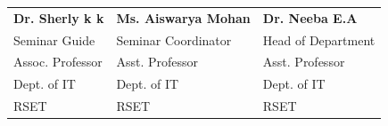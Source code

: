 \vspace{4cm}
\begin{center}
   \begin{tabularx}{1 \textwidth} { 
   >{\raggedright\arraybackslash}X 
   >{\centering\arraybackslash}X 
   >{\raggedleft\arraybackslash}X  }
   \textbf{Dr. Sherly k k}
      &  \textbf{Ms. Aiswarya Mohan} & \textbf{Dr. Neeba E.A}\\
     Seminar Guide & Seminar Coordinator & Head of Department\\
     Assoc. Professor & Asst. Professor & Asst. Professor\\
     Dept. of IT & Dept. of IT & Dept. of IT\\
     RSET & RSET & RSET
\end{tabularx} 
\end{center}

			                    		